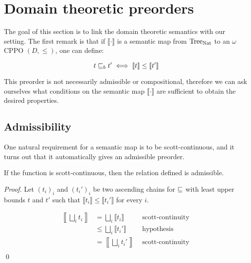 
\section{Domain theoretic preorders}

The goal of this section is to link the domain theoretic semantics 
with our setting. The first remark is that if 
$\llbracket \cdot \rrbracket$ is a semantic map from $\textnormal{Tree}_{\textnormal{Nat}}$ to 
an $\omega$CPPO $(D,\leq)$, one can define:

\begin{equation*}
    t \sqsubseteq_b t' \iff \llbracket t \rrbracket \leq \llbracket t' \rrbracket 
\end{equation*}

This preorder is not necessarily admissible or compositional, therefore 
we can ask ourselves what conditions on the semantic map $\llbracket \cdot
\rrbracket$ are sufficient to obtain the desired properties.


\subsection{Admissibility}


One natural requirement for a semantic map is to be scott-continuous, and 
it turns out that it automatically gives an admissible preorder.

\begin{alemma}[Admissibility]
    \label{lem:continuousadm}
    If the function is scott-continuous, then the relation defined 
    is admissible.
\end{alemma}


\begin{proof}
    Let $(t_i)_i$ and $(t_i')_i$ be two ascending chains for $\sqsubseteq$
    with least upper bounds $t$ and $t'$ such that $\llbracket t_i \rrbracket
    \leq \llbracket t_i' \rrbracket$ for every $i$.

    \begin{align*}
        \left\llbracket \bigsqcup_i t_i \right\rrbracket &= \bigsqcup_i \llbracket t_i
        \rrbracket & \text{ scott-continuity } \\
                   &\leq \bigsqcup_i \llbracket t_i' \rrbracket & 
                    \text{ hypothesis } \\
                   &= \left\llbracket \bigsqcup_i t_i' \right\rrbracket &
                    \text{ scott-continuity } \\
    \end{align*}
\qed\end{proof}



